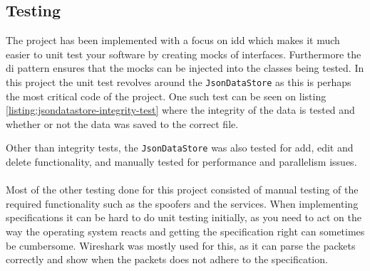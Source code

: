 \documentclass{article}
\begin{document}
\subsection{Testing}
The project has been implemented with a focus on \gls{idd} which makes it much easier to unit test your software by creating mocks of interfaces. Furthermore the \gls{di} pattern ensures that the mocks can be injected into the classes being tested. In this project the unit test revolves around the \texttt{JsonDataStore} as this is perhaps the most critical code of the project. One such test can be seen on listing \ref{listing:jsondatastore-integrity-test} where the integrity of the data is tested and whether or not the data was saved to the correct file.

Other than integrity tests, the \texttt{JsonDataStore} was also tested for add, edit and delete functionality, and manually tested for performance and parallelism issues.
\\\\
Most of the other testing done for this project consisted of manual testing of the required functionality such as the spoofers and the services. When implementing specifications it can be hard to do unit testing initially, as you need to act on the way the operating system reacts and getting the specification right can sometimes be cumbersome. Wireshark\cite{url:implementation:wireshark} was mostly used for this, as it can parse the packets correctly and show when the packets does not adhere to the specification.
\end{document}
